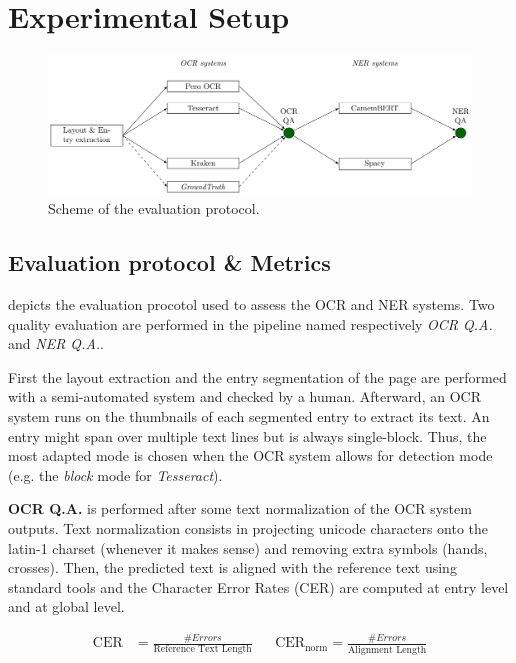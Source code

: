 \section{Experimental Setup}


\begin{figure}[tb]
\includegraphics[width=\linewidth]{figs/protocol.pdf}
\caption{Scheme of the evaluation protocol.}
\label{fig.protocol}
\end{figure}

\subsection{Evaluation protocol \& Metrics}

 depicts the evaluation procotol used to assess the OCR and NER systems. Two quality evaluation
are performed in the pipeline named respectively \emph{OCR Q.A.} and \emph{NER Q.A.}.

First the layout extraction and the entry segmentation of the page are performed with a semi-automated system and
checked by a human. Afterward, an OCR system runs on the thumbnails of each segmented entry to extract its text. An
entry might span over multiple text lines but is always single-block. Thus, the most adapted mode is chosen when
the OCR system allows for detection mode (e.g. the \emph{block} mode for \emph{Tesseract}). 

\textbf{OCR Q.A.} is performed after some text normalization of the OCR system outputs. Text normalization consists in
projecting unicode characters onto the latin-1 charset (whenever it makes sense) and removing extra symbols (hands,
crosses). Then, the predicted text is aligned with the reference text using standard tools and the Character Error Rates
(CER) are computed at entry level and at global level. 

\begin{align}
\mathrm{CER} &=  \frac{\#Errors}{\text{Reference Text Length}} & & \mathrm{CER}_\mathrm{norm} =  \frac{\#Errors}{\text{Alignment Length}} 
\end{align}

